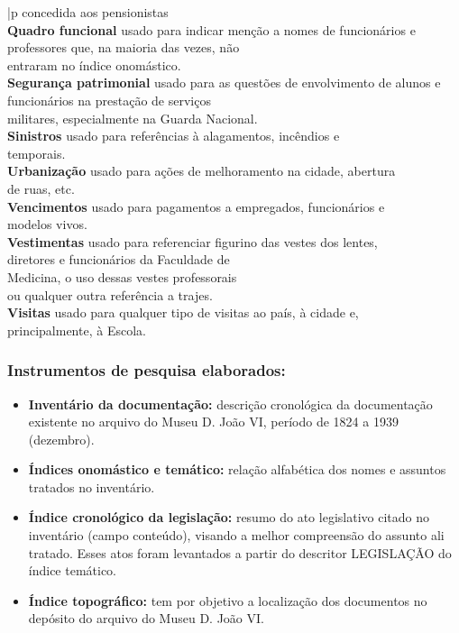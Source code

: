 \begin{tabbing}{|p}
	\>\> \> concedida aos pensionistas\\
	\textbf{Quadro funcional} \>\>usado para \> indicar menção a nomes de funcionários e\\
	\>\> \> professores que, na maioria das vezes, não\\
	\>\> \> entraram no índice onomástico.\\
	\textbf{Segurança patrimonial} \>\>usado para \> as questões de envolvimento de alunos e\\
	\>\> \> funcionários na prestação de serviços\\
	\>\> \> militares, especialmente na Guarda Nacional.\\
	\textbf{Sinistros} \>\>usado para \> referências à alagamentos, incêndios e\\
	\>\> \> temporais.\\
	\textbf{Urbanização} \>\>usado para \> ações de melhoramento na cidade, abertura\\
	\>\> \> de ruas, etc.\\
	\textbf{Vencimentos} \>\>usado para \> pagamentos a empregados, funcionários e\\
	\>\> \> modelos vivos.\\
	\textbf{Vestimentas} \>\>usado para \> referenciar figurino das vestes dos lentes,\\
	\>\> \> diretores e funcionários da Faculdade de\\
	\>\> \> Medicina, o uso dessas vestes professorais\\
	\>\> \> ou qualquer outra referência a trajes.\\
	\textbf{Visitas} \>\>usado para \> qualquer tipo de visitas ao país, à cidade e,\\
	\>\> \> principalmente, à Escola.\\
\end{tabbing}

\subsubsection{Instrumentos de pesquisa elaborados:}

\begin{itemize}
	\item \textbf{Inventário da documentação:} descrição cronológica da documentação existente no arquivo do Museu D. João VI, período de 1824 a 1939 (dezembro).
	
	\item \textbf{Índices onomástico e temático:} relação alfabética dos nomes e assuntos tratados no inventário.
	
	\item \textbf{Índice cronológico da legislação:} resumo do ato legislativo citado no inventário (campo conteúdo), visando a melhor compreensão do assunto ali tratado. Esses atos foram levantados a partir do descritor LEGISLAÇÃO do índice temático.
	
	\item \textbf{Índice topográfico:} tem por objetivo a localização dos documentos no depósito do arquivo do Museu D. João VI.
\end{itemize}

